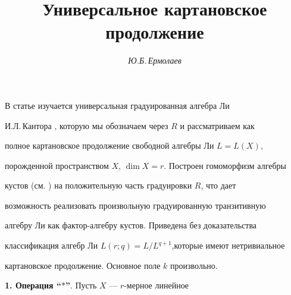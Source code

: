 \author{\it Ю.Б.\,Ермолаев} 


\title{Универсальное картановское продолжение} 


 




\date{} 




 


\pagestyle{plain} %


 


 




 


\maketitle 


 




 


В статье изучается универсальная градуированная алгебра Ли


И.Л.\,Кантора \cite{Kan}, которую мы обозначаем через $R$ и рассматриваем как


полное картановское продолжение свободной алгебры Ли $L=L(X)$,


порожденной пространством $X$, $\dim X = r$. Построен гомоморфизм алгебры


кустов (см. \cite{Erm}) на положительную часть градуировки $R$, что дает


возможность реализовать произвольную градуированную транзитивную


алгебру Ли как фактор-алгебру кустов. Приведена без доказательства


классификация алгебр Ли $L(r;q)=L/L^{q+1}$,которые имеют нетривиальное


картановское продолжение. Основное поле $k$ произвольно.


\medskip





{\bf 1. Операция ``$*$''}. Пусть $X$ --- $r$-мерное линейное



